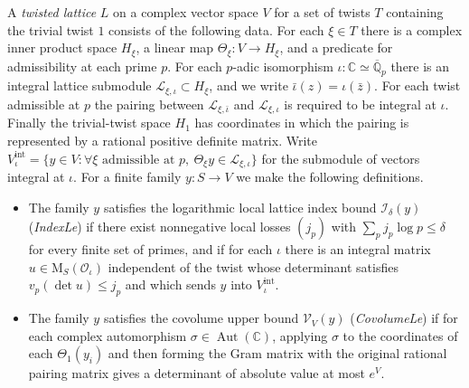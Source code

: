 \begin{definition}
\label{def:twisted-lattice}
\emitthmsource
A \emph{twisted lattice} $L$ on a complex vector space $V$ for a set of twists $T$ containing the trivial twist $1$ consists of the following data. For each $\xi\in T$ there is a complex inner product space $H_\xi$, a linear map $\Theta_\xi\colon V\to H_\xi$, and a predicate for admissibility at each prime $p$. For each $p$-adic isomorphism $\iota\colon\mathbb C\simeq\overline{\mathbb Q}_p$ there is an integral lattice submodule $\mathcal L_{\xi,\iota}\subset H_\xi$, and we write $\bar\iota(z)=\iota(\bar z)$. For each twist admissible at $p$ the pairing between $\mathcal L_{\xi,\bar\iota}$ and $\mathcal L_{\xi,\iota}$ is required to be integral at $\iota$. Finally the trivial-twist space $H_1$ has coordinates in which the pairing is represented by a rational positive definite matrix.
Write $V_\iota^{\mathrm{int}}=\{y\in V:\forall\xi\text{ admissible at }p,\ \Theta_\xi y\in\mathcal L_{\xi,\iota}\}$ for the submodule of vectors integral at $\iota$. For a finite family $y\colon S\to V$ we make the following definitions.
\begin{itemize}
\item The family $y$ satisfies the logarithmic local lattice index bound $\mathcal I_\delta(y)$ (\emph{IndexLe}) if there exist nonnegative local losses $(j_p)$ with $\sum_p j_p\log p\le\delta$ for every finite set of primes, and if for each $\iota$ there is an integral matrix $u\in\mathrm M_S(\mathcal O_\iota)$ independent of the twist whose determinant satisfies $v_p(\det u)\le j_p$ and which sends $y$ into $V_\iota^{\mathrm{int}}$.
\item The family $y$ satisfies the covolume upper bound $\mathcal V_V(y)$ (\emph{CovolumeLe}) if for each complex automorphism $\sigma\in\operatorname{Aut}(\mathbb C)$, applying $\sigma$ to the coordinates of each $\Theta_1(y_i)$ and then forming the Gram matrix with the original rational pairing matrix gives a determinant of absolute value at most $e^V$.
\end{itemize}
\end{definition}

